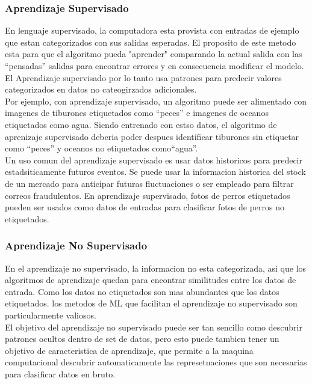 \subsubsection{Aprendizaje Supervisado}
En lenguaje supervisado, la computadora esta provista con entradas de ejemplo que estan categorizados con sus salidas esperadas. El proposito de este metodo esta para que el algoritmo pueda "aprender" comparando la actual salida con las ``pensadas'' salidas para encontrar errores y en consecuencia modificar el modelo. El Aprendizaje supervisado por lo tanto usa patrones para predecir valores categorizados en datos no cateogirzados adicionales.\\

Por ejemplo, con aprendizaje supervisado, un algoritmo puede ser alimentado con imagenes de tiburones etiquetados como ``peces'' e imagenes de oceanos etiquetados como agua. Siendo entrenado con estso datos, el algoritmo de aprenizaje supervisado deberia poder despues identificar tiburones sin etiquetar como ``peces'' y oceanos no etiquetados como``agua''.\\

Un uso comun del aprendizaje supervisado es usar datos historicos para predecir estadsiticamente futuros eventos. Se puede usar la informacion historica del stock de un mercado para anticipar futuras fluctuaciones o ser empleado para filtrar correos fraudulentos. En aprendizaje supervisado, fotos de perros etiquetados pueden ser usados como datos de entradas para clasificar fotos de perros no etiquetados.\\

\subsubsection{Aprendizaje No Supervisado}
En el aprendizaje no supervisado, la informacion no esta categorizada, asi que los algoritmos de aprendizaje quedan para encontrar similitudes entre los datos de entrada. Como los datos no etiquetados son mas abundantes que los datos etiquetados. los metodos de ML que facilitan el aprendizaje no supervisado son particularmente valiosos.\\

El objetivo del aprendizaje no supervisado puede ser tan sencillo como descubrir patrones ocultos dentro de set de datos, pero esto puede tambien tener un objetivo de caracteristica de aprendizaje, que permite a la maquina computacional descubrir automaticamente las represetnaciones que son necesarias para clasificar datos en bruto.\\

